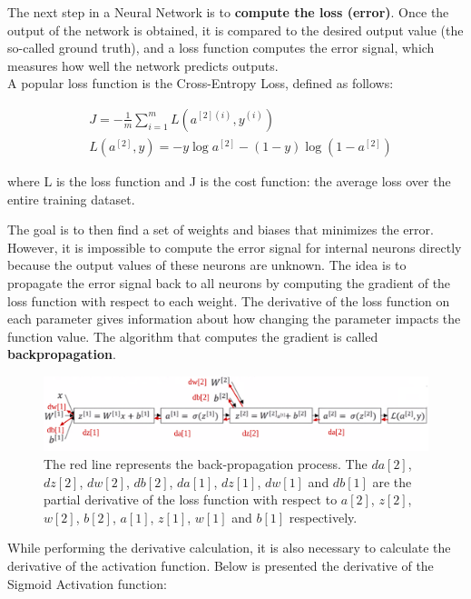 The next step in a Neural Network is to \textbf{compute the loss (error)}. Once the output of the network is obtained, it is compared to the desired output value (the so-called ground truth), and a loss function computes the error signal, which measures how well the network predicts outputs.\\
A popular loss function is the Cross-Entropy Loss, defined as follows:

\begin{equation}
\begin{aligned}
&J=-\frac{1}{m} \sum_{i=1}^{m} L\left(a^{[2](i)}, y^{(i)}\right) \\
&L\left(a^{[2]}, y\right)=-y \log a^{[2]}-(1-y) \log \left(1-a^{[2]}\right)
\end{aligned}
\end{equation}

where L is the loss function and J is the cost function: the average loss over the entire training dataset.

\noindent The goal is to then find a set of weights and biases that minimizes the error.
However, it is impossible to compute the error signal for internal neurons directly because the output values of these neurons are unknown.
The idea is to propagate the error signal back to all neurons by computing the gradient of the loss function with respect to each weight.
The derivative of the loss function on each parameter gives information about how changing the parameter impacts the function value.
The algorithm that computes the gradient is called \textbf{backpropagation}.

\begin{figure}[h]
	\centering
	\includegraphics[width=0.9\linewidth]{images/approaches/deep_learning/backprop_nn.png}
	\caption[footnote-3d]{The red line represents the back-propagation process. The $da[2]$, $dz[2]$, $dw[2]$, $db[2]$, $da[1]$, $dz[1]$, $dw[1]$ and $db[1]$ are the partial derivative of the loss function with respect to $a[2]$, $z[2]$, $w[2]$, $b[2]$, $a[1]$, $z[1]$, $w[1]$ and $b[1]$ respectively.}
	\label{fig:backprop}
\end{figure}

While performing the derivative calculation, it is also necessary to calculate the derivative of the activation function. Below is presented the derivative of the Sigmoid Activation function:

